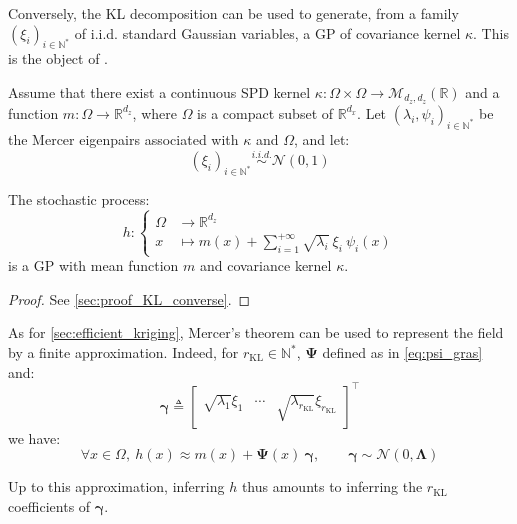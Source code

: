 Conversely, the KL decomposition can be used to generate, from a family $(\xi_i)_{i\in\mathbb{N}^*}$ of i.i.d. standard Gaussian variables, a GP of covariance kernel $\kappa$. This is the object of .

\begin{proposition}\label{th:KL_converse}
	Assume that there exist a continuous SPD kernel $\kappa:\Omega\times\Omega\to\mathcal{M}_{d_z,d_z}(\mathbb{R})$ and a function $m:\Omega\to\mathbb{R}^{d_z}$, where $\Omega$ is a compact subset of $\mathbb{R}^{d_x}$. Let $(\lambda_i,\psi_i)_{i\in\mathbb{N}^*}$ be the Mercer eigenpairs associated with $\kappa$ and $\Omega$, and let:
	\begin{equation}
		(\xi_i)_{i\in\mathbb{N}^*}\overset{i.i.d.}{\sim}\mathcal{N}(0,1)
	\end{equation}

	The stochastic process:
	\begin{equation}
		h:\left\{\begin{aligned}
		\Omega&\to\mathbb{R}^{d_z}\\
		x&\mapsto m(x)+\sum_{i=1}^{+\infty}\sqrt{\lambda_i}\:\xi_i\:\psi_i(x)
		\end{aligned}\right.
	\end{equation}
	is a GP with mean function $m$ and covariance kernel $\kappa$.
\end{proposition}

\begin{proof}
	See \cref{sec:proof_KL_converse}.
\end{proof}

\begin{remark}\label{th:KL_parametrisation}
	As for \cref{sec:efficient_kriging}, Mercer's theorem can be used to represent the field by a finite approximation. Indeed, for $r_{\mathrm{KL}}\in\mathbb{N}^*$, $\boldsymbol{\Psi}$ defined as in \eqref{eq:psi_gras} and:
	\begin{equation}
		\boldsymbol{\gamma}\triangleq\begin{bmatrix}\sqrt{\lambda_1}\xi_1&\cdots&\sqrt{\lambda_{r_{\mathrm{KL}}}}\xi_{r_{\mathrm{KL}}}\end{bmatrix}^\top
	\end{equation}
	we have:
	\begin{equation}
		\forall x\in\Omega,\:h(x)\approx m(x)+\boldsymbol{\Psi}(x)\:\boldsymbol{\gamma},\qquad\boldsymbol{\gamma}\sim\mathcal{N}(0,\boldsymbol{\Lambda})
	\end{equation}

	Up to this approximation, inferring $h$ thus amounts to inferring the $r_{\mathrm{KL}}$ coefficients of $\boldsymbol{\gamma}$.
\end{remark}
